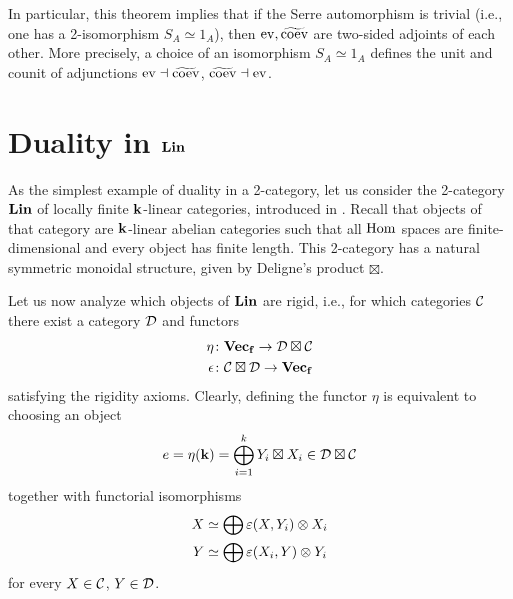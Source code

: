 In particular, this theorem implies that if the Serre automorphism is trivial
(i.e., one has a 2-isomorphism $S_A\simeq 1_A$), then $\operatorname{ev}, \widetilde{\operatorname{coev}}$ are
two-sided adjoints of each other. More precisely, a choice of an isomorphism
$S_A\simeq 1_A$ defines the unit and counit of adjunctions $\operatorname{ev}\dashv
\widetilde{\operatorname{coev}}$, $\widetilde{\operatorname{coev}}\dashv\operatorname{ev}$.



\section{Duality in $\mathbf{Lin}$}\label{s:lin-duals}
As the simplest example of duality in a 2-category, let us consider the
2-category $\mathbf{Lin}$ of locally finite $\mathbf{k}$-linear  categories, introduced in
. Recall that objects of that category are $\mathbf{k}$-linear
abelian categories such that all $\operatorname{Hom}$ spaces are finite-dimensional and every
object has finite length. This 2-category has a natural symmetric monoidal
structure, given by Deligne's product $\boxtimes$.

Let us now analyze which objects of $\mathbf{Lin}$ are rigid, i.e., for which
categories $\mathcal{C}$ there exist a category $\mathcal{D}$ and functors
\begin{align*}
  \eta&\colon \mathbf{Vec_f} \to \mathcal{D}\boxtimes \mathcal{C}\\
  \epsilon&\colon \mathcal{C}\boxtimes \mathcal{D}\to \mathbf{Vec_f}
\end{align*}
satisfying the rigidity axioms. Clearly, defining the functor $\eta$ is equivalent
to choosing an object
$$
  e=\eta (\mathbf{k})=\bigoplus_{i=1}^k Y_i\boxtimes X_i\in \mathcal{D}\boxtimes \mathcal{C}
$$
together with functorial isomorphisms
\begin{equation}\label{e:rigidity-lin}
  \begin{aligned}
    X&\simeq \bigoplus \varepsilon(X,Y_i)\otimes X_i\\
    Y&\simeq \bigoplus \varepsilon(X_i,Y)\otimes Y_i
  \end{aligned}
\end{equation}
for every $X\in \mathcal{C}$, $Y\in \mathcal{D}$.


